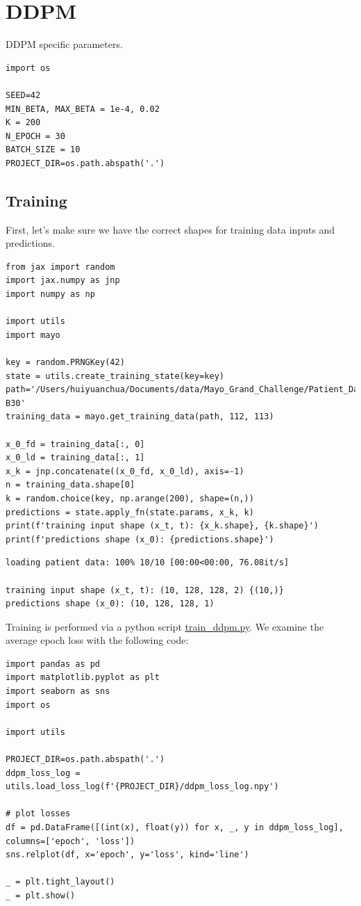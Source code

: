 \documentclass[a4paper, 11pt]{article}
\begin{document}
\section{DDPM}
\label{sec:org9277717}
DDPM specific parameters.
\begin{verbatim}
import os

SEED=42
MIN_BETA, MAX_BETA = 1e-4, 0.02
K = 200
N_EPOCH = 30
BATCH_SIZE = 10
PROJECT_DIR=os.path.abspath('.')
\end{verbatim}

\subsection{Training}
\label{sec:org26d8269}
First, let's make sure we have the correct shapes for training data inputs and predictions.
\begin{verbatim}
from jax import random
import jax.numpy as jnp
import numpy as np

import utils
import mayo

key = random.PRNGKey(42)
state = utils.create_training_state(key=key)
path='/Users/huiyuanchua/Documents/data/Mayo_Grand_Challenge/Patient_Data/Training_Image_Data/3mm B30'
training_data = mayo.get_training_data(path, 112, 113)

x_0_fd = training_data[:, 0]
x_0_ld = training_data[:, 1]
x_k = jnp.concatenate((x_0_fd, x_0_ld), axis=-1)
n = training_data.shape[0]
k = random.choice(key, np.arange(200), shape=(n,))
predictions = state.apply_fn(state.params, x_k, k)
print(f'training input shape (x_t, t): {x_k.shape}, {k.shape}')
print(f'predictions shape (x_0): {predictions.shape}')
\end{verbatim}

\begin{verbatim}
loading patient data: 100% 10/10 [00:00<00:00, 76.08it/s]

training input shape (x_t, t): (10, 128, 128, 2) {(10,)}
predictions shape (x_0): (10, 128, 128, 1)
\end{verbatim}

Training is performed via a python script \url{train\_ddpm.py}. We examine the average epoch loss with the following code:
\begin{verbatim}
import pandas as pd
import matplotlib.pyplot as plt
import seaborn as sns
import os

import utils

PROJECT_DIR=os.path.abspath('.')
ddpm_loss_log = utils.load_loss_log(f'{PROJECT_DIR}/ddpm_loss_log.npy')

# plot losses
df = pd.DataFrame([(int(x), float(y)) for x, _, y in ddpm_loss_log], columns=['epoch', 'loss'])
sns.relplot(df, x='epoch', y='loss', kind='line')

_ = plt.tight_layout()
_ = plt.show()
\end{verbatim}
\end{document}
